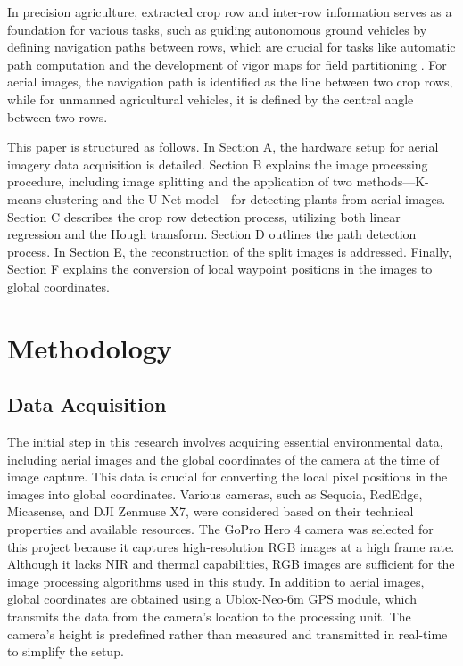 \documentclass[conference]{IEEEtran}
\begin{document}
In precision agriculture, extracted crop row and inter-row information serves as a foundation for various tasks, such as guiding autonomous ground vehicles by defining navigation paths between rows, which are crucial for tasks like automatic path computation and the development of vigor maps for field partitioning \cite{b11}. For aerial images, the navigation path is identified as the line between two crop rows, while for unmanned agricultural vehicles, it is defined by the central angle between two rows\cite{b1}.

This paper is structured as follows. In Section A, the hardware setup for aerial imagery data acquisition is detailed. Section B explains the image processing procedure, including image splitting and the application of two methods—K-means clustering and the U-Net model—for detecting plants from aerial images. Section C describes the crop row detection process, utilizing both linear regression and the Hough transform. Section D outlines the path detection process. In Section E, the reconstruction of the split images is addressed. Finally, Section F explains the conversion of local waypoint positions in the images to global coordinates.

\section{Methodology}


\subsection{Data Acquisition}
The initial step in this research involves acquiring essential environmental data, including aerial images and the global coordinates of the camera at the time of image capture. This data is crucial for converting the local pixel positions in the images into global coordinates. Various cameras, such as Sequoia, RedEdge, Micasense, and DJI Zenmuse X7, were considered based on their technical properties and available resources. The GoPro Hero 4 camera was selected for this project because it captures high-resolution RGB images at a high frame rate. Although it lacks NIR and thermal capabilities, RGB images are sufficient for the image processing algorithms used in this study. In addition to aerial images, global coordinates are obtained using a Ublox-Neo-6m GPS module, which transmits the data from the camera’s location to the processing unit. The camera’s height is predefined rather than measured and transmitted in real-time to simplify the setup.
\end{document}
